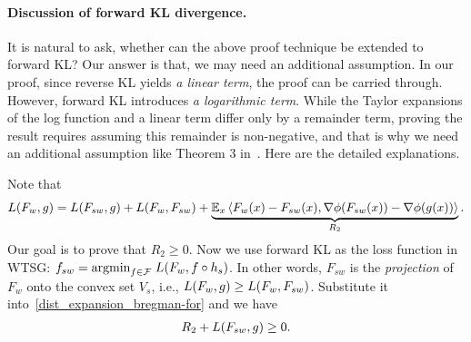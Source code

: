 \paragraph{Discussion of forward KL divergence.}
It is natural to ask, whether can the above proof technique be extended to forward KL?
Our answer is that, we may need an additional assumption.
In our proof, since reverse KL yields \textit{a linear term}, the proof can be carried through. However, forward KL introduces \textit{a logarithmic term}. 
While the Taylor expansions of the log function and a linear term differ only by a remainder term, proving the result requires assuming this remainder is non-negative, and that is why we need an additional assumption like Theorem 3 in~\citep{yao2025understanding}.
Here are the detailed explanations.

Note that
\begin{align} \label{dist_expansion_bregman-for}
    L(F_w, g) = L(F_{sw}, g) + L(F_w, F_{sw}) + \underbrace{\mathbb{E}_x \left \langle F_w(x)-F_{sw}(x), \nabla \phi(F_{sw}(x)) - \nabla \phi(g(x)) \right \rangle}_{R_2}.
\end{align}
Our goal is to prove that $R_2 \ge 0$.
Now we use forward KL as the loss function in WTSG: $f_{sw} = \text{argmin}_{f \in \mathcal{F}}\; L(F_w, f \circ h_s)$.
In other words, $F_{sw}$ is the \textit{projection} of $F_w$ onto the convex set $V_s$, i.e., $L(F_w, g) \ge L(F_w, F_{sw})$.
Substitute it into~\cref{dist_expansion_bregman-for} and we have
\begin{align} \label{bregman:disc-for}
    R_2 + L(F_{sw}, g) \ge 0.
\end{align}

